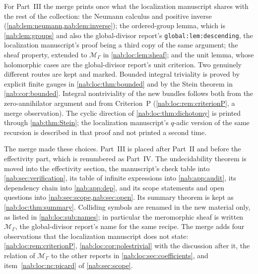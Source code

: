 \documentclass[11pt,letterpaper]{article}
\theoremstyle{definition}
\theoremstyle{remark}
\newcommand{\MM}{\mathscr M_\Gamma}
\numberwithin{equation}{section}
\begin{document}
For Part~III the merge prints once what the localization manuscript shares with
the rest of the collection: the Neumann calculus and positive inverse
(\cref{nab:lem:neumann,nab:lem:inverse}); the ordered-group lemma, which is
\cref{nab:lem:groups} and also the global-divisor report's
\texttt{global:lem:descending}, the localization manuscript's proof being a
third copy of the same argument; the sheaf property, extended to $\MM$ in
\cref{nab:loc:lem:sheaf}; and the unit lemma, whose holomorphic cases are the
global-divisor report's unit criterion. Two genuinely different routes are
kept and marked. Bounded integral triviality is proved by explicit finite gauges
in \cref{nab:loc:thm:bounded} and by the Stein theorem in \cref{nab:cor:bounded}.
Integral nontriviality of the new bundles follows both from the
zero-annihilator argument and from Criterion~P (\cref{nab:loc:rem:criterionP},
a merge observation). The cyclic direction of \cref{nab:loc:thm:dichotomy} is
printed through \cref{nab:thm:Stein}; the localization manuscript's $q$-adic
version of the same recursion is described in that proof and not printed a
second time.

The merge made these choices. Part~III is placed after Part~II and before the
effectivity part, which is renumbered as Part~IV. The undecidability theorem is
moved into the effectivity section, the manuscript's check table into
\cref{nab:sec:verification}, its table of infinite expressions into
\cref{nab:app:audit}, its dependency chain into \cref{nab:app:dep}, and its
scope statements and open questions into \cref{nab:sec:scope,nab:sec:open}. Its
summary theorem is kept as \cref{nab:loc:thm:summary}. Colliding symbols are
renamed in the new material only, as listed in \cref{nab:loc:sub:names}; in
particular the meromorphic sheaf is written $\MM$, the global-divisor report's
name for the same recipe. The merge adds four observations that the
localization manuscript does not state:
\cref{nab:loc:rem:criterionP}, \cref{nab:loc:cor:polestrivial} with the
discussion after it, the relation of $\MM$ to the other reports in
\cref{nab:loc:sec:coefficients}, and item~\ref{nab:loc:nc:picard} of
\cref{nab:sec:scope}.
\end{document}

